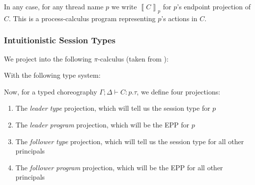 \documentclass{article}
\theoremstyle{definition}
\newcommand{\proves}{\vdash}
\newcommand{\transb}[1]{\left\llbracket #1 \right\rrbracket}
\begin{document}
In any case, for any thread name $p$ we write $\transb{C}_p$ for $p$'s endpoint projection of $C$.
This is a process-calculus program representing $p$'s actions in $C$.

\subsubsection{Intuitionistic Session Types}
We project into the following $\pi$-calculus (taken from \citet{ToninhoCP12}):
\begin{syntax}
  \alternative{[y \leftrightarrow x]}
\end{syntax}
With the following type system:

Now, for a typed choreography $\Gamma; \Delta \proves C : p.\tau$, we define four projections:
\begin{enumerate}
\item The \emph{leader type} projection, which will tell us the session type for $p$
\item The \emph{leader program} projection, which will be the EPP for $p$
\item The \emph{follower type} projection, which will tell us the session type for all other principals
\item The \emph{follower program} projection, which will be the EPP for all other principals
\end{enumerate}
\end{document}
